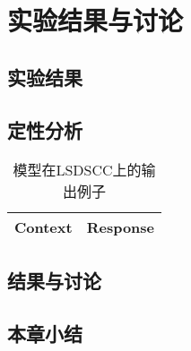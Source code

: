 
\chapter{实验结果与讨论}\label{ch:experiment}

\section{实验结果}\label{sec:experiment_result}

\section{定性分析}\label{sec:qualitative_analysis}
\begin{table}
    \centering
    \caption{模型在LSDSCC上的输出例子}
    \label{tab:LSDSCC_examples}
    \begin{tabular}{l|l}
        \textbf{Context} & \textbf{Response} \\
        \hline


    \end{tabular}
\end{table}
\section{结果与讨论}\label{sec:result_and_discussion}

\section{本章小结}\label{sec:experiment_conclusion}
